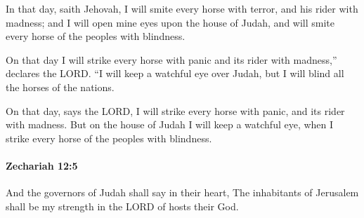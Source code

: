 			\begin{versebox}
					\item[BHS] 
					\item[LXX] 
					\item[ASV] In that day, saith Jehovah, I will smite every horse with terror, and his rider with madness; and I will open mine eyes upon the house of Judah, and will smite every horse of the peoples with blindness.
					\item[NIV] On that day I will strike every horse with panic and its rider with madness,” declares the LORD. “I will keep a watchful eye over Judah, but I will blind all the horses of the nations.
					\item[NRSV] On that day, says the LORD, I will strike every horse with panic, and its rider with madness. But on the house of Judah I will keep a watchful eye, when I strike every horse of the peoples with blindness.
			\end{versebox}

		\paragraph{Zechariah 12:5} %
			\label{ZECHARIAH-12-5}

			And the governors of Judah shall say in their heart, The inhabitants of Jerusalem shall be my strength in the LORD of hosts their God.

